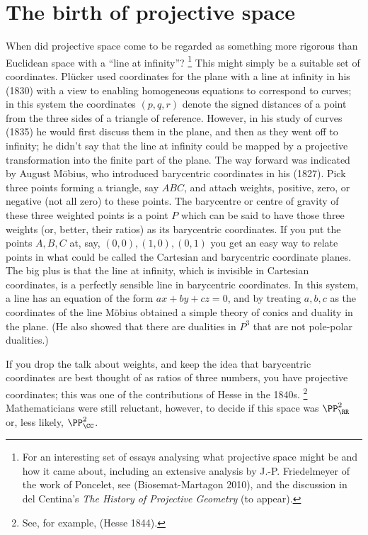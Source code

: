 \section{The birth of projective space}
When did projective space come to be regarded as something more rigorous
than Euclidean space with a ``line at infinity''?%
%
\footnote{For an
interesting  set of essays analysing what projective space might be and
how it came about, including an extensive analysis by J.-P. Friedelmeyer
of the work of Poncelet, see (Biosemat-Martagon 2010), and the discussion
in del Centina's \emph{The History of Projective Geometry} (to appear).}
%
 This might simply be a suitable set of coordinates. Pl\"ucker used
 coordinates for the plane with a line at infinity in his (1830) with
 a view to enabling homogeneous equations to correspond to curves; in
 this system the coordinates $(p, q, r)$ denote the signed distances of
 a point from the three sides of a triangle of reference. However, in
 his study of curves (1835) he would first discuss them in  the plane,
 and then as they went off to infinity; he didn't say that the line at
 infinity could be mapped by a projective transformation into the finite
 part of the plane.  The way forward was indicated by August M\"obius,
 who introduced barycentric coordinates in his (1827). Pick three points
 forming a triangle, say $ABC$, and attach weights, positive, zero, or
 negative (not all zero) to these points. The barycentre or centre of
 gravity of these three weighted points is a point $P$ which can be said
 to have those three weights (or, better, their ratios) as its barycentric
 coordinates. If you put the points $A, B, C$ at, say,  $(0, 0), (1, 0),
 (0, 1)$ you get an easy way to relate points in what could be called
 the Cartesian and barycentric coordinate planes. The big plus is that
 the line at infinity, which is invisible in Cartesian coordinates, is
 a perfectly sensible line in barycentric coordinates. In this system,
 a line has an equation of the form $ax+by+cz=0$, and by treating $a,
 b, c$ as the coordinates of the line M\"obius obtained a simple theory
 of conics and duality in the plane. (He also showed that there are
 dualities in $P^3$ that are not pole-polar dualities.)

If you drop the talk about weights, and keep the idea that barycentric
coordinates are best thought of as ratios of three numbers, you have
projective coordinates; this was one of the contributions of Hesse in
the 1840s.%
%
\footnote{See, for example, (Hesse 1844).}
%
Mathematicians were still reluctant, however, to decide if this space
was $\PP_{\RR}^2$ or, less likely, $\PP_{\CC}^2$.

